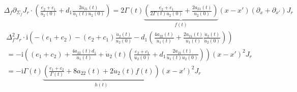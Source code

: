 \documentclass{article}
\begin{document}
    \begin{align*}
        \Delta_f\partial_{\Sigma_f}J_r\cdot\left(\frac{e_2+c_1}{\dot{u}_2(0)}+d_1\frac{2a_{21}(t)}{\dot{u}_1(t)\dot{u}_2(0)}\right)=2\Gamma(t)\underbrace{\left(\frac{e_2+c_1}{2\Gamma(t)\dot{u}_2(0)}+\frac{2a_{21}(t)}{\dot{u}_2(0)}\right)}_{f(t)}(x-x')(\partial_x+\partial_{x'})J_r
    \end{align*}
    \begin{align*}
        \Delta_f^2 J_r\cdot\mathrm{i}\left(-(e_1+c_2)-(e_2+c_1)\frac{\dot{u}_2(t)}{\dot{u}_2(0)}-d_1\left( \frac{4a_{22}(t)}{\dot{u}_1(t)} + \frac{2a_{21}(t)}{\dot{u}_1(t)} \frac{\dot{u}_2(t)}{\dot{u}_2(0)} \right)\right)\\
        =-\mathrm{i}\left((e_1+c_2)+\frac{4a_{22}(t)d_1}{\dot{u}_1(t)}+\dot{u}_2(t)(\frac{e_2+c_1}{\dot{u}_2(0)}+d_1\frac{2a_{21}(t)}{\dot{u}_1(t)\dot{u}_2(0)})\right)(x-x')^2J_r\\
        =-\mathrm{i}\Gamma(t)\underbrace{\left(\frac{e_1+c_2}{\Gamma(t)}+8a_{22}(t)+2\dot{u}_2(t)f(t)\right)}_{h(t)}(x-x')^2J_r
    \end{align*}
\end{document}
